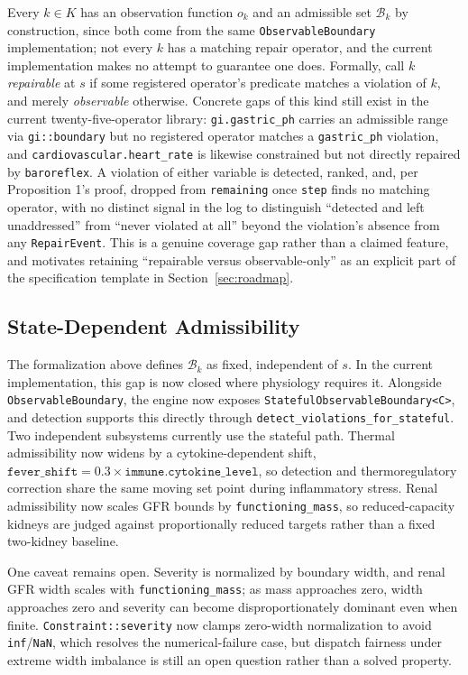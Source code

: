 \documentclass[11pt]{article}
\begin{document}
Every $k \in K$ has an observation function $o_k$ and an admissible set $\mathcal B_k$ by construction, since both come from the same \texttt{ObservableBoundary} implementation; not every $k$ has a matching repair operator, and the current implementation makes no attempt to guarantee one does. Formally, call $k$ \emph{repairable} at $s$ if some registered operator's predicate matches a violation of $k$, and merely \emph{observable} otherwise. Concrete gaps of this kind still exist in the current twenty-five-operator library: \texttt{gi.gastric\_ph} carries an admissible range via \texttt{gi::boundary} but no registered operator matches a \texttt{gastric\_ph} violation, and \texttt{cardiovascular.heart\_rate} is likewise constrained but not directly repaired by \texttt{baroreflex}. A violation of either variable is detected, ranked, and, per Proposition 1's proof, dropped from \texttt{remaining} once \texttt{step} finds no matching operator, with no distinct signal in the log to distinguish ``detected and left unaddressed'' from ``never violated at all'' beyond the violation's absence from any \texttt{RepairEvent}. This is a genuine coverage gap rather than a claimed feature, and motivates retaining ``repairable versus observable-only'' as an explicit part of the specification template in Section~\ref{sec:roadmap}.

\subsection{State-Dependent Admissibility}
\label{sec:formal-stateful}

The formalization above defines $\mathcal B_k$ as fixed, independent of $s$. In the current implementation, this gap is now closed where physiology requires it. Alongside \texttt{ObservableBoundary}, the engine now exposes \texttt{StatefulObservableBoundary<C>}, and detection supports this directly through \texttt{detect\_violations\_for\_stateful}. Two independent subsystems currently use the stateful path. Thermal admissibility now widens by a cytokine-dependent shift, $\texttt{fever\_shift} = 0.3 \times \texttt{immune.cytokine\_level}$, so detection and thermoregulatory correction share the same moving set point during inflammatory stress. Renal admissibility now scales GFR bounds by \texttt{functioning\_mass}, so reduced-capacity kidneys are judged against proportionally reduced targets rather than a fixed two-kidney baseline.

One caveat remains open. Severity is normalized by boundary width, and renal GFR width scales with \texttt{functioning\_mass}; as mass approaches zero, width approaches zero and severity can become disproportionately dominant even when finite. \texttt{Constraint::severity} now clamps zero-width normalization to avoid \texttt{inf}/\texttt{NaN}, which resolves the numerical-failure case, but dispatch fairness under extreme width imbalance is still an open question rather than a solved property.
\end{document}
